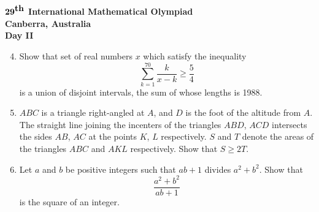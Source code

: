 \documentclass[12pt]{article}
\begin{document}
\pagebreak %
\begin{center}
${\bf 29}^{\mbox{\bf th}}$ {\bf International
Mathematical Olympiad} \\[.1in]
{\bf Canberra, Australia} \\ [.05in]
{\bf Day II}\\[.05in]
\end{center}

\vspace*{.3in}

\begin{enumerate}
\setcounter{enumi}{3}
\item
Show that set of real numbers $x$ which satisfy the inequality
$$\sum_{k=1}^{70} \frac{k}{x - k} \geq \frac{5}{4}$$
is a union of disjoint intervals, the sum of whose lengths is 1988.

\item
$ABC$ is a triangle right-angled at $A$, and $D$ is the foot of the altitude
from $A$.  The straight line joining the incenters of the triangles $ABD$,
$ACD$ intersects the sides $AB$, $AC$ at the points $K$, $L$ respectively.
$S$ and $T$ denote the areas of the triangles $ABC$ and $AKL$ respectively.
Show that $S \geq 2T$.

\item
Let $a$ and $b$ be positive integers such that $ab + 1$ divides $a^2 + b^2$.
Show that
$$\frac{a^2 + b^2}{ab + 1}$$
is the square of an integer.
\end{enumerate}
\end{document}
